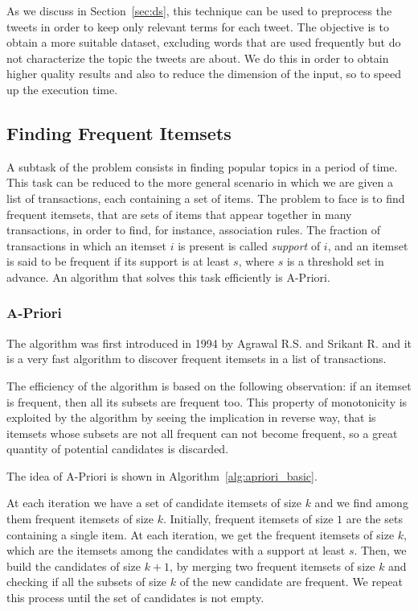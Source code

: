 As we discuss in Section~\ref{sec:ds}, this technique can be used to preprocess the tweets in order to 
keep only relevant terms for each tweet. The objective is to obtain a more 
suitable dataset, excluding words that are used frequently but 
do not characterize the topic the tweets are about. We do this in order to obtain higher quality 
results and also to reduce the dimension of the input, so to speed up the execution time. 

\subsection{Finding Frequent Itemsets}
A subtask of the problem consists in finding popular topics in a period of time. This task can 
be reduced to the more general scenario in which we are given a list of
transactions, each containing a set of items. The problem to face is to find frequent 
itemsets, that are sets of items that appear 
together in many transactions, in order to find, for instance, association rules.
The fraction of transactions in which an itemset $i$ is present is called \emph{support} 
of $i$, and an itemset is said to be frequent if its support is at least $s$, where 
$s$ is a threshold set in advance.
An algorithm that solves this task efficiently is A-Priori.

\subsubsection{A-Priori}
The algorithm was first introduced in 1994 by Agrawal R.S. and Srikant R. and
it is a very fast algorithm to discover frequent itemsets in a
list of transactions.~\cite{rw:apriori}

The efficiency of the algorithm is based on the following observation:
if an itemset is frequent, then all its subsets are frequent too.
This property of monotonicity is exploited by the algorithm by 
seeing the implication in reverse way, that is itemsets whose 
subsets are not all frequent can not become frequent, so a great 
quantity of potential candidates is discarded.

The idea of A-Priori is shown in Algorithm~\ref{alg:apriori_basic}.


At each iteration we have a set of candidate itemsets of size $k$ and 
we find among them frequent itemsets of size $k$. 
Initially, frequent itemsets of size $1$ are the sets containing a single item.
At each iteration, we get the frequent itemsets of size $k$, which are 
the itemsets among the candidates with a support at least $s$.
Then, we build the candidates of size $k+1$, by merging two frequent itemsets 
of size $k$ and checking if all the subsets of size $k$ of the new candidate 
are frequent. We repeat this process until the set of candidates is not empty.

